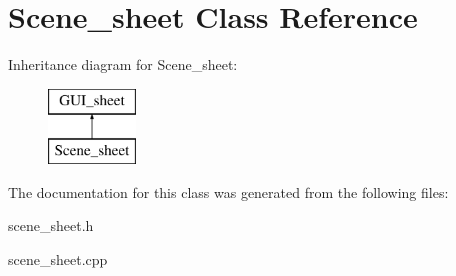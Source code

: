 \hypertarget{class_scene__sheet}{
\section{Scene\_\-sheet Class Reference}
\label{class_scene__sheet}
}
Inheritance diagram for Scene\_\-sheet:\begin{figure}[H]
\begin{center}
\leavevmode
\includegraphics[height=2.000000cm]{class_scene__sheet}
\end{center}
\end{figure}


The documentation for this class was generated from the following files:\begin{DoxyCompactItemize}
\item 
scene\_\-sheet.h\item 
scene\_\-sheet.cpp\end{DoxyCompactItemize}

